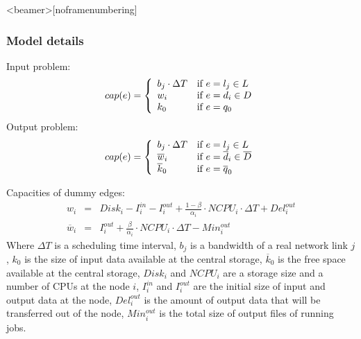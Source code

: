 \documentclass{beamer}
\begin{document}
\begin{frame}<beamer>[noframenumbering]\frametitle{Model details}
\begin{scriptsize}


Input problem:
\begin{equation} 
\label{edge_cap} 
cap(e) = \left\{
\begin{array}{l l} 
b_{j} \cdot \Delta T & \text{if }e = l_{j} \in L \\ w_{i} &
\text{if } e = d_{i} \in D\\ k_{0} & \text{if } e = q_{0} 
\end{array} \right.
\end{equation} 
Output problem:
\begin{equation}
\label{edge_cap_out}
cap(e) = \left\{ 
  \begin{array}{l l}
    b_{j} \cdot \Delta T & \text{if }e = l_{j} \in L \\
    \overline{w}_{i} & \text{if } e = \overline{d}_{i} \in \overline{D}\\
    \overline{k}_{0} & \text{if } e = \overline{q}_{0}
  \end{array} \right.
\end{equation}

Capacities of dummy edges:
\begin{eqnarray}
w_{i} &=&
Disk_{i} - I_{i}^{in} - I_{i}^{out} + \frac{1 - \beta}{\alpha_{i}} \cdot
NCPU_{i} \cdot \Delta T + Del_{i}^{out} \label{w}\\
\overline{w}_{i} &=& I_{i}^{out} + \frac{\beta}{\alpha_{i}} \cdot NCPU_{i} \cdot \Delta T - Min_{i}^{out} \label{sigma}
\end{eqnarray}  
Where $\Delta T$ is a scheduling time interval, $b_{j}$ is a bandwidth of a real network link $j$, $k_{0}$ is the size of input data available at the central storage, $\overline{k}_{0}$ is the free space available at the central storage, $Disk_{i}$ and $NCPU_{i}$ are a storage size and a number of CPUs at the node $i$,  $I_{i}^{in}$ and $I_{i}^{out}$ are the initial size of input and output data at the node, $Del_{i}^{out}$ is the amount of output data that will be transferred out of the node, $Min_{i}^{out}$ is the total size of output files of running jobs. 

\end{scriptsize}
\end{frame}
\end{document}
